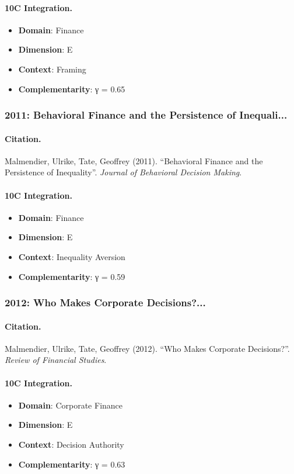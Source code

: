 \paragraph{10C Integration.}
\begin{itemize}[nosep]
  \item \textbf{Domain}: Finance
  \item \textbf{Dimension}: E
  \item \textbf{Context}: Framing
  \item \textbf{Complementarity}: γ = 0.65
\end{itemize}


\subsubsection{2011: Behavioral Finance and the Persistence of Inequali...}

\paragraph{Citation.}
Malmendier, Ulrike, Tate, Geoffrey (2011). ``Behavioral Finance and the Persistence of Inequality''. \textit{Journal of Behavioral Decision Making}.

\paragraph{10C Integration.}
\begin{itemize}[nosep]
  \item \textbf{Domain}: Finance
  \item \textbf{Dimension}: E
  \item \textbf{Context}: Inequality Aversion
  \item \textbf{Complementarity}: γ = 0.59
\end{itemize}


\subsubsection{2012: Who Makes Corporate Decisions?...}

\paragraph{Citation.}
Malmendier, Ulrike, Tate, Geoffrey (2012). ``Who Makes Corporate Decisions?''. \textit{Review of Financial Studies}.

\paragraph{10C Integration.}
\begin{itemize}[nosep]
  \item \textbf{Domain}: Corporate Finance
  \item \textbf{Dimension}: E
  \item \textbf{Context}: Decision Authority
  \item \textbf{Complementarity}: γ = 0.63
\end{itemize}


